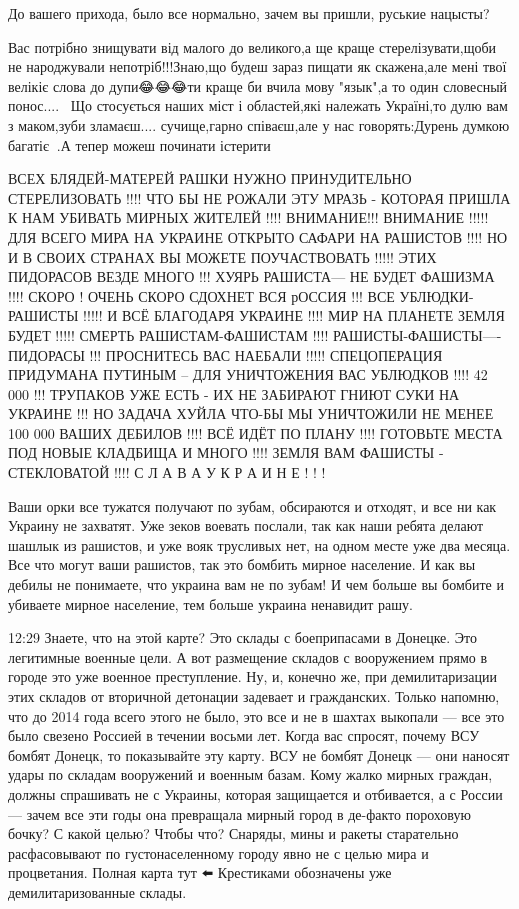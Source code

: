 {До вашего прихода, было все нормально, зачем вы пришли, руськие нацысты?

Вас потрібно знищувати від малого до великого,а ще краще стерелізувати,щоби не
народжували непотріб!!!Знаю,що будеш зараз пищати як скажена,але мені твої
велікіє слова до дупи😂😂😂ти краще би вчила мову "язык",а то один словесный
понос....🤮🤮🤮Що стосується наших міст і областей,які належать Україні,то дулю
вам з маком,зуби зламаєш.... сучище,гарно співаєш,але у нас говорять:Дурень
думкою багатіє💙💛.А тепер можеш починати істерити🤣🤣🤣


ВСЕХ БЛЯДЕЙ-МАТЕРЕЙ РАШКИ НУЖНО ПРИНУДИТЕЛЬНО СТЕРЕЛИЗОВАТЬ !!!! ЧТО БЫ НЕ
РОЖАЛИ ЭТУ МРАЗЬ - КОТОРАЯ ПРИШЛА К НАМ УБИВАТЬ МИРНЫХ ЖИТЕЛЕЙ !!!! ВНИМАНИЕ!!!
ВНИМАНИЕ !!!!! ДЛЯ ВСЕГО МИРА НА УКРАИНЕ ОТКРЫТО САФАРИ НА РАШИСТОВ !!!! НО И В
СВОИХ СТРАНАХ ВЫ МОЖЕТЕ ПОУЧАСТВОВАТЬ !!!!! ЭТИХ ПИДОРАСОВ ВЕЗДЕ МНОГО !!!
ХУЯРЬ РАШИСТА--- НЕ БУДЕТ ФАШИЗМА !!!! СКОРО ! ОЧЕНЬ СКОРО СДОХНЕТ ВСЯ рОССИЯ
!!! ВСЕ УБЛЮДКИ-РАШИСТЫ !!!!! И ВСЁ БЛАГОДАРЯ УКРАИНЕ !!!! МИР НА ПЛАНЕТЕ ЗЕМЛЯ
БУДЕТ !!!!! СМЕРТЬ РАШИСТАМ-ФАШИСТАМ !!!! РАШИСТЫ-ФАШИСТЫ----ПИДОРАСЫ !!!
ПРОСНИТЕСЬ ВАС НАЕБАЛИ !!!!! СПЕЦОПЕРАЦИЯ ПРИДУМАНА ПУТИНЫМ -- ДЛЯ УНИЧТОЖЕНИЯ
ВАС УБЛЮДКОВ !!!! 42 000 !!! ТРУПАКОВ УЖЕ ЕСТЬ - ИХ НЕ ЗАБИРАЮТ ГНИЮТ СУКИ НА
УКРАИНЕ !!! НО ЗАДАЧА ХУЙЛА ЧТО-БЫ МЫ УНИЧТОЖИЛИ НЕ МЕНЕЕ 100 000 ВАШИХ ДЕБИЛОВ
!!!! ВСЁ ИДЁТ ПО ПЛАНУ !!!! ГОТОВЬТЕ МЕСТА ПОД НОВЫЕ КЛАДБИЩА И МНОГО !!!!
ЗЕМЛЯ ВАМ ФАШИСТЫ - СТЕКЛОВАТОЙ !!!! С Л А В А У К Р А И Н Е ! ! !


Ваши орки все тужатся получают по зубам, обсираются и отходят, и все ни как
Украину не захватят. Уже зеков воевать послали, так как наши ребята делают
шашлык из рашистов, и уже вояк трусливых нет, на одном месте уже два месяца.
Все что могут ваши рашистов, так это бомбить мирное население. И как вы дебилы
не понимаете, что украина вам не по зубам! И чем больше вы бомбите и убиваете
мирное население, тем больше украина ненавидит рашу.

12:29
Знаете, что на этой карте? Это склады с боеприпасами в Донецке. Это легитимные
военные цели. А вот размещение складов с вооружением прямо в городе это уже
военное преступление. Ну, и, конечно же, при демилитаризации этих складов от
вторичной детонации задевает и гражданских. Только напомню, что до 2014 года
всего этого не было, это все и не в шахтах выкопали — все это было свезено
Россией в течении восьми лет. Когда вас спросят, почему ВСУ бомбят Донецк, то
показывайте эту карту. ВСУ не бомбят Донецк — они наносят удары по складам
вооружений и военным базам. Кому жалко мирных граждан, должны спрашивать не с
Украины, которая защищается и отбивается, а с России — зачем все эти годы она
превращала мирный город в де-факто пороховую бочку? С какой целью? Чтобы что?
Снаряды, мины и ракеты старательно расфасовывают по густонаселенному городу
явно не с целью мира и процветания. Полная карта тут ⬅️ Крестиками обозначены
уже демилитаризованные склады.

}
